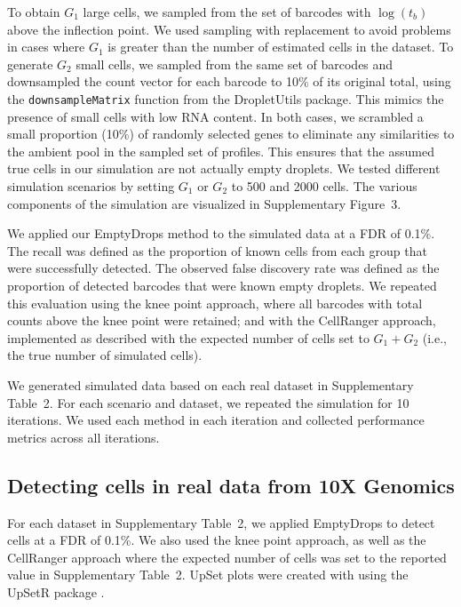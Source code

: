 \documentclass[10pt,letterpaper]{article}
\newcommand{\code}[1]{\texttt{#1}}
\newcommand{\supptabdataset}{2}
\newcommand{\suppfigsimdesign}{3}
\begin{document}
To obtain $G_1$ large cells, we sampled from the set of barcodes with $\log(t_b)$ above the inflection point.
We used sampling with replacement to avoid problems in cases where $G_1$ is greater than the number of estimated cells in the dataset.
To generate $G_2$ small cells, we sampled from the same set of barcodes and downsampled the count vector for each barcode to 10\% of its original total,
using the \code{downsampleMatrix} function from the \textsf{DropletUtils} package.
This mimics the presence of small cells with low RNA content. 
In both cases, we scrambled a small proportion (10\%) of randomly selected genes to eliminate any similarities to the ambient pool in the sampled set of profiles.
This ensures that the assumed true cells in our simulation are not actually empty droplets.
We tested different simulation scenarios by setting $G_1$ or $G_2$ to 500 and 2000 cells.
The various components of the simulation are visualized in Supplementary Figure~\suppfigsimdesign{}.

We applied our EmptyDrops method to the simulated data at a FDR of 0.1\%. 
The recall was defined as the proportion of known cells from each group that were successfully detected.
The observed false discovery rate was defined as the proportion of detected barcodes that were known empty droplets.
We repeated this evaluation using the knee point approach, where all barcodes with total counts above the knee point were retained;
and with the CellRanger approach, implemented as described \cite{zheng2017massively} with the expected number of cells set to $G_1+G_2$ (i.e., the true number of simulated cells).

We generated simulated data based on each real dataset in Supplementary Table~\supptabdataset{}.
For each scenario and dataset, we repeated the simulation for 10 iterations.
We used each method in each iteration and collected performance metrics across all iterations.

\subsection*{Detecting cells in real data from 10X Genomics}
For each dataset in Supplementary Table~\supptabdataset{}, we applied EmptyDrops to detect cells at a FDR of 0.1\%. 
We also used the knee point approach, as well as the CellRanger approach where the expected number of cells was set to the reported value in Supplementary Table~\supptabdataset{}.
UpSet plots were created with using the \textsf{UpSetR} package \cite{lex2014upset}.
\end{document}
